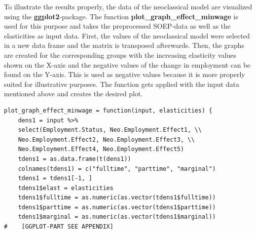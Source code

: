 \documentclass[a4paper]{article}
\begin{document}
To illustrate the results properly, the data of the neoclassical model are visualized using the \textbf{ggplot2}-package. The function \textbf{plot\_graph\_effect\_minwage} is used for this purpose and takes the preprocessed SOEP-data as well as the elasticities as input data. First, the values of the neoclassical model were selected in a new data frame and the matrix is transposed afterwards. Then, the graphs are created for the corresponding groups with the increasing elasticity values shown on the X-axis and the negative values of the change in employment can be found on the Y-axis. This is used as negative values because it is more properly suited for illustrative purposes. The function gets applied with the input data mentioned above and creates the desired plot.
\begin{lstlisting}
plot_graph_effect_minwage = function(input, elasticities) {
    dens1 = input %>% 
    select(Employment.Status, Neo.Employment.Effect1, \\
    Neo.Employment.Effect2, Neo.Employment.Effect3, \\
    Neo.Employment.Effect4, Neo.Employment.Effect5) 
    tdens1 = as.data.frame(t(dens1))
    colnames(tdens1) = c("fulltime", "parttime", "marginal")
    tdens1 = tdens1[-1, ]
    tdens1$elast = elasticities
    tdens1$fulltime = as.numeric(as.vector(tdens1$fulltime))
    tdens1$parttime = as.numeric(as.vector(tdens1$parttime))
    tdens1$marginal = as.numeric(as.vector(tdens1$marginal))
#    [GGPLOT-PART SEE APPENDIX]
\end{lstlisting}
\end{document}
